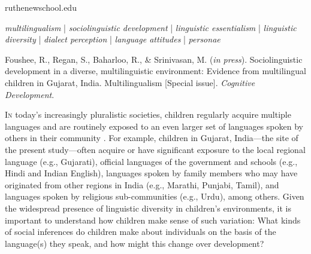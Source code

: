 \documentclass{foushee-adapted-preprint}
\begin{document}
\begin{corrauthor}
ruthe\at newschool.edu
\end{corrauthor}
\begin{keywords}
\noindent
\textit{multilingualism} | \textit{sociolinguistic development} | \textit{linguistic essentialism} | \textit{linguistic diversity} | \textit{dialect perception} | \textit{language attitudes} | \textit{personae}
\end{keywords}
\vspace{-5pt}
\begin{pubcitation}
Foushee, R., Regan, S., Baharloo, R., \& Srinivasan, M. (\textit{in press}). Sociolinguistic development in a diverse, multilinguistic environment: Evidence from multilingual children in Gujarat, India. Multilingualism [Special issue]. \textit{Cognitive Development}.
\end{pubcitation}
\maketitle
\vspace{5pt}
\lettrine{I}n today's increasingly pluralistic societies, children regularly acquire multiple languages and are routinely exposed to an even larger set of languages spoken by others in their community \parencite{lin2020research, grosjean2010bilingual}. 
For example, children in Gujarat, India---the site of the present study---often acquire or have significant exposure to the local regional language (e.g., Gujarati), official languages of the government and schools (e.g., Hindi and Indian English), languages spoken by family members who may have originated from other regions in India (e.g., Marathi, Punjabi, Tamil), and languages spoken by religious sub-communities (e.g., Urdu), among others. Given the widespread presence of linguistic diversity in children's environments, it is important to understand how children make sense of such variation: What kinds of social inferences do children make about individuals on the basis of the language(s) they speak, and how might this change over development? %
\end{document}
